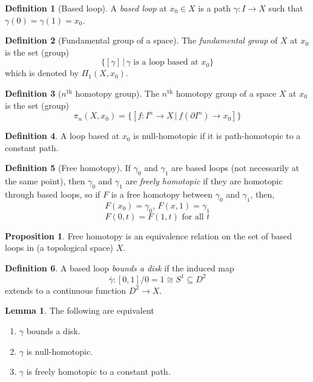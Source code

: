 \documentclass[a4paper,14pt]{extarticle}
\theoremstyle{definition}
\newtheorem*{definition}{Definition}
\newtheorem*{lemma}{Lemma}
\newtheorem*{proposition}{Proposition}
\begin{document}
\begin{definition}[Based loop]
  A \emph{based loop} at $x_0\in X$ is a path $\gamma:I\rightarrow X$ such that 
  $\gamma(0)=\gamma(1)=x_0$.
\end{definition}

\begin{definition}[Fundamental group of a space]
  The \emph{fundamental group} of $X$ at $x_0$ is the set (group)
  \[\{[\gamma]\,|\,\gamma\text{ is a loop based at }x_0\}\]
  which is denoted by $\Pi_1(X,x_0)$.
\end{definition}

\begin{definition}[$n^{\text{th}}$ homotopy group]
  The $n^{\text{th}}$ homotopy group of a space $X$ at $x_0$ is the set (group)
  \[\pi_n(X,x_0)=\{[f:I^n\rightarrow X\,|\,f(\partial I^n)\rightarrow x_0]\}\]
\end{definition}

\begin{definition}
  A loop based at $x_0$ is null-homotopic if it is path-homotopic to a constant path.
\end{definition}

\begin{definition}[Free homotopy]
  If $\gamma_0$ and $\gamma_1$ are based loops (not necessarily at the same point), then 
  $\gamma_0$ and $\gamma_1$ are \emph{freely homotopic} if they are homotopic through 
  based loops, so if $F$ is a free homotopy between $\gamma_0$ and $\gamma_1$, then,
  \[F(x_0)=\gamma_0, \,F(x,1)=\gamma_1\] \[F(0,t)=F(1,t)\text{ for all }t\]
\end{definition}

\begin{proposition}
  Free homotopy is an equivalence relation on the set of based loops in (a topological space)
  $X$.
\end{proposition}

\begin{definition}
  A based loop \emph{bounds a disk} if the induced map \[\bar{\gamma}:[0,1]/
  {\scriptstyle 0=1}\cong S^1
  \subseteq D^2\] extends to a continuous function $D^2\rightarrow X$.
\end{definition}

\begin{lemma}
  The following are equivalent
  \begin{enumerate}
    \item $\gamma$ bounds a disk. 
    \item $\gamma$ is null-homotopic.
    \item $\gamma$ is freely homotopic to a constant path.
  \end{enumerate}
\end{lemma}
\end{document}
